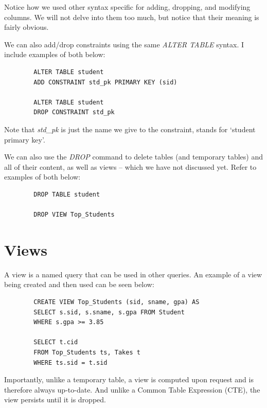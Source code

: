 \documentclass{article}
\begin{document}
Notice how we used other syntax specific for adding, dropping, and modifying columns. We will not delve into them too much, but notice that their meaning is fairly obvious.

We can also add/drop constraints using the same \textit{ALTER TABLE} syntax. I include examples of both below:

\begin{tcolorbox}
    \begin{verbatim}
        ALTER TABLE student
        ADD CONSTRAINT std_pk PRIMARY KEY (sid)

        ALTER TABLE student
        DROP CONSTRAINT std_pk
    \end{verbatim}
\end{tcolorbox}

Note that \textit{std\_pk} is just the name we give to the constraint, stands for `student primary key'.

We can also use the \textit{DROP} command to delete tables (and temporary tables) and all of their content, as well as views -- which we have not discussed yet. Refer to examples of both below:

\begin{tcolorbox}
    \begin{verbatim}
        DROP TABLE student
        
        DROP VIEW Top_Students
    \end{verbatim}
\end{tcolorbox}

\section*{Views}
A view is a named query that can be used in other queries. An example of a view being created and then used can be seen below:

\begin{tcolorbox}
    \begin{verbatim}
        CREATE VIEW Top_Students (sid, sname, gpa) AS
        SELECT s.sid, s.sname, s.gpa FROM Student
        WHERE s.gpa >= 3.85

        SELECT t.cid
        FROM Top_Students ts, Takes t
        WHERE ts.sid = t.sid
    \end{verbatim}
\end{tcolorbox}

Importantly, unlike a temporary table, a view is computed upon request and is therefore always up-to-date. And unlike a Common Table Expression (CTE), the view persists until it is dropped.
\end{document}
